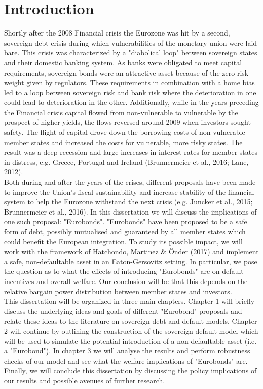 \mainmatter
\pagestyle{headings}

\chapter*{Introduction}
Shortly after the 2008 Financial crisis the Eurozone was hit by a second, sovereign debt crisis during which vulnerabilities of the monetary union were laid bare. This crisis was characterized by a "diabolical loop" between sovereign states and their domestic banking system. As banks were obligated to meet capital requirements, sovereign bonds were an attractive asset because of the zero risk-weight given by regulators. These requirements in combination with a home bias led to a loop between sovereign risk and bank risk where the deterioration in one could lead to deterioration in the other. Additionally, while in the years preceding the Financial crisis capital flowed from non-vulnerable to vulnerable by the prospect of higher yields, the flows reversed around 2009 when investors sought safety. The flight of capital drove down the borrowing costs of non-vulnerable member states and increased the costs for vulnerable, more risky states. The result was a deep recession and large increases in interest rates for member states in distress, e.g. Greece, Portugal and Ireland (Brunnermeier et al., 2016; Lane, 2012).\\

Both during and after the years of the crises, different proposals have been made to improve the Union's fiscal sustainability and increase stability of the financial system to help the Eurozone withstand the next crisis (e.g. Juncker et al., 2015; Brunnermeier et al., 2016). In this dissertation we will discuss the implications of one such proposal: "Eurobonds". "Eurobonds" have been proposed to be a safe form of debt, possibly mutualised and guaranteed by all member states which could benefit the European integration. To study its possible impact, we will work with the framework of Hatchondo, Martinez \& Önder (2017) and implement a safe, non-defaultable asset in an Eaton-Gersovitz setting. In particular, we pose the question as to what the effects of introducing "Eurobonds" are on default incentives and overall welfare. Our conclusion will be that this depends on the relative bargain power distribution between member states and investors.\\

This dissertation will be organized in three main chapters. Chapter 1 will briefly discuss the underlying ideas and goals of different "Eurobond" proposals and relate these ideas to the literature on sovereign debt and default models. Chapter 2 will continue by outlining the construction of the sovereign default model which will be used to simulate the potential introduction of a non-defaultable asset (i.e. a "Eurobond"). In chapter 3 we will analyse the results and perform robustness checks of our model and see what the welfare implications of "Eurobonds" are. Finally, we will conclude this dissertation by discussing the policy implications of our results and possible avenues of further research.\\


